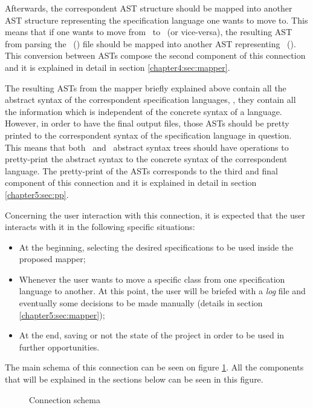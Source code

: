 Afterwards, the correspondent AST structure should be mapped into another AST structure representing the specification language one wants to move to. This means that if one wants to move from \vpp\ to \jml\ (or vice-versa), the resulting AST from parsing the \vpp\ (\jml) file should be mapped into another AST representing \jml\ (\vpp). This conversion between ASTs compose the second component of this connection and it is explained in detail in section \ref{chapter4:sec:mapper}.

The resulting ASTs from the mapper briefly explained above contain all the abstract syntax of the correspondent specification languages, \ie, they contain all the information which is independent of the concrete syntax of a language. However, in order to have the final output files, those ASTs should be pretty printed to the correspondent syntax of the specification language in question. This means that both \jml\ and \vpp\ abstract syntax trees should have operations to pretty-print the abstract syntax to the concrete syntax of the correspondent language. The pretty-print of the ASTs corresponds to the third and final component of this connection and it is explained in detail in section \ref{chapter5:sec:pp}.

Concerning the user interaction with this connection, it is expected that the user interacts with it in the following specific situations:
\begin{itemize}
\item At the beginning, selecting the desired specifications to be used inside the proposed mapper;
\item Whenever the user wants to move a specific class from one specification language to another. At this point, the user will be briefed with a \textit{log} file and eventually some decisions to be made manually (details in section \ref{chapter5:sec:mapper});
\item At the end, saving or not the state of the project in order to be used in further opportunities.
\end{itemize}

The main schema of this connection can be seen on figure \ref{chapter5:pic:connectionschema}. All the components that will be explained in the sections below can be seen in this figure.

\begin{figure}
\begin{center}
\end{center}
\caption{Connection schema}
\label{chapter5:pic:connectionschema}
\end{figure}


